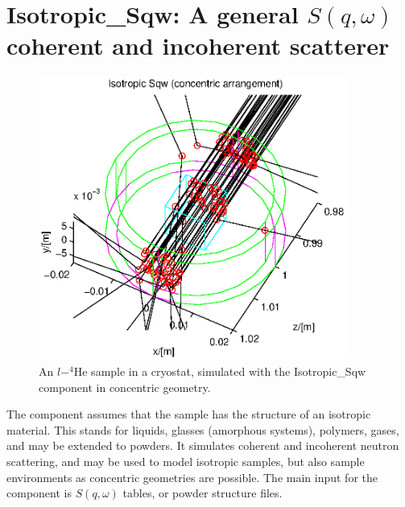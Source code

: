 \section{Isotropic\_Sqw: A general $S(q,\omega)$ coherent and incoherent scatterer}
\label{s:isotropic-sqw}


\begin{figure}
  \begin{center}
    \includegraphics[width=0.9\textwidth]{figures/sqw.eps}
  \end{center}
\caption{An $l-^4$He sample in a cryostat, simulated with the Isotropic\_Sqw component in concentric geometry.}
\label{f:isotropic-sqw}
\end{figure}

The component assumes that the sample has the structure of an isotropic material. This stands for liquids, glasses (amorphous systems), polymers, gases, and may be extended to powders. It simulates coherent and incoherent neutron scattering, and may be used to model isotropic samples, but also sample environments as concentric geometries are possible. The main input for the component is $S(q,\omega)$ tables, or powder structure files.

